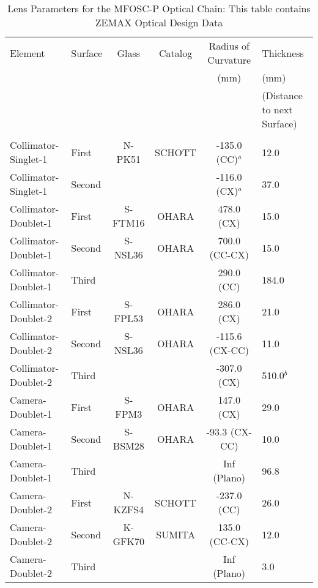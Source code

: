 \begin{table}
	\centering
	\caption{Lens Parameters for the MFOSC-P Optical Chain: This table contains ZEMAX Optical Design Data}
	\begin{tabular}{p{3.0cm}lcccp{2.3cm}}
		\hline
		\hline	
		Element &  Surface & Glass & Catalog & Radius of Curvature & Thickness  \\
		&          &       &         &     (mm)            &   (mm)   \\
		&          &       &         &                     &   (Distance to next Surface) \\
		
		\hline    
		&          &       &         &                     &   \\    
		Collimator-Singlet-1 & First  & N-PK51   & SCHOTT & -135.0 (CC)$^{a}$      & 12.0    \\
		Collimator-Singlet-1 & Second &          &        & -116.0 (CX)$^{a}$      & 37.0    \\
		Collimator-Doublet-1 & First  & S-FTM16  & OHARA  &  478.0 (CX)      & 15.0    \\
		Collimator-Doublet-1 & Second & S-NSL36  & OHARA  &  700.0 (CC-CX)  & 15.0    \\
		Collimator-Doublet-1 & Third  &          &        &  290.0 (CC)      & 184.0   \\
		Collimator-Doublet-2 & First  & S-FPL53  & OHARA  &  286.0 (CX)      & 21.0    \\
		Collimator-Doublet-2 & Second & S-NSL36  & OHARA  & -115.6 (CX-CC)& 11.0    \\
		Collimator-Doublet-2 & Third  &          &        & -307.0 (CX)      & 510.0$^{b}$   \\
		Camera-Doublet-1     & First  & S-FPM3   & OHARA  &  147.0 (CX)      & 29.0    \\
		Camera-Doublet-1     & Second & S-BSM28  & OHARA  & -93.3 (CX-CC) & 10.0    \\
		Camera-Doublet-1     & Third  &          &        &  Inf (Plano)   & 96.8  \\
		Camera-Doublet-2     & First  & N-KZFS4  & SCHOTT & -237.0 (CC)      & 26.0    \\
		Camera-Doublet-2     & Second & K-GFK70  & SUMITA &  135.0 (CC-CX)  & 12.0    \\
		Camera-Doublet-2     & Third  &          &        &  Inf (Plano)   & 3.0     \\

\end{tabular}
\end{table}
